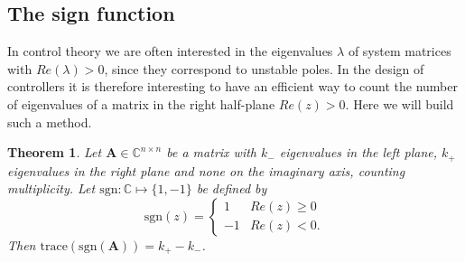 \documentclass[11pt]{article}
\newtheorem{theorem}{Theorem}
\numberwithin{equation}{section}
\begin{document}
\subsection{The sign function}
In control theory we are often interested in the eigenvalues $\lambda$ of system matrices with $Re(\lambda)>0$, since they correspond to unstable poles. In the design of controllers it is therefore interesting to have an efficient way to count the number of eigenvalues of a matrix in the right half-plane $Re(z)>0$. Here we will build such a method.
\begin{theorem}\label{thm:sign}
Let $\mathbf{A}\in\mathbb{C}^{n \times n}$ be a matrix with $k_{-}$ eigenvalues in the left plane, $k_{+}$ eigenvalues in the right plane and none on the imaginary axis, counting multiplicity. Let $\text{sgn}:\mathbb{C}\mapsto \{1,-1\}$ be defined by
$$\text{sgn}(z)= \begin{cases} 
      1 & Re(z)\geq 0 \\
      -1 & Re(z)<0. 
   \end{cases}
$$
Then $\text{trace}(\text{sgn}(\mathbf{A}))=k_{+}-k_{-}$.
\end{theorem}
\end{document}

